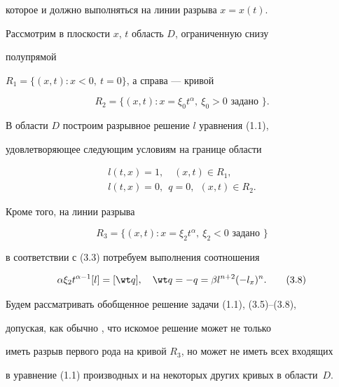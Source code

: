 которое и должно выполняться на линии разрыва $x=x(t)$. 


 


Рассмотрим в плоскости $x$, $t$ область $D$, ограниченную снизу 


полупрямой 


$R_1=\{(x,t):x<0,\ t=0\}$, а справа --- кривой 


\begin{equation} 


R_2=\{(x,t):x=\xi_0t^\alpha,\ \xi_0>0 \text{ задано }\}.\tag{3.4} 


\end{equation} 


В области $D$ построим разрывное решение $l$ уравнения (1.1), 


удовлетворяющее следующим условиям на границе области 


\begin{gather} 


l(t,x)=1,\quad (x,t)\in R_1,\tag{3.5} \\ 


l(t,x)=0,\ \ q=0,\ \ (x,t)\in R_2.\tag{3.6} 


\end{gather} 


Кроме того, на линии разрыва 


\begin{equation} 


R_3=\{(x,t):x=\xi_2t^\alpha,\ \xi_2<0 \text{ задано }\} \tag{3.7} 


\end{equation} 


в соответствии с (3.3) потребуем выполнения соотношения 


\begin{equation} 


\alpha\xi_2t^{\alpha-1}[l]=[\wt q],\quad 


\wt q=-q=\beta l^{n+2}(-l_x)^n.\tag{3.8} 


\end{equation} 


Будем рассматривать обобщенное решение задачи (1.1), (3.5)--(3.8), 


допуская, как обычно \cite{5}, что искомое решение может не только 


иметь разрыв первого рода на кривой $R_3$, но может не иметь всех входящих 


в уравнение (1.1) производных и на некоторых других кривых в области~$D$. 


